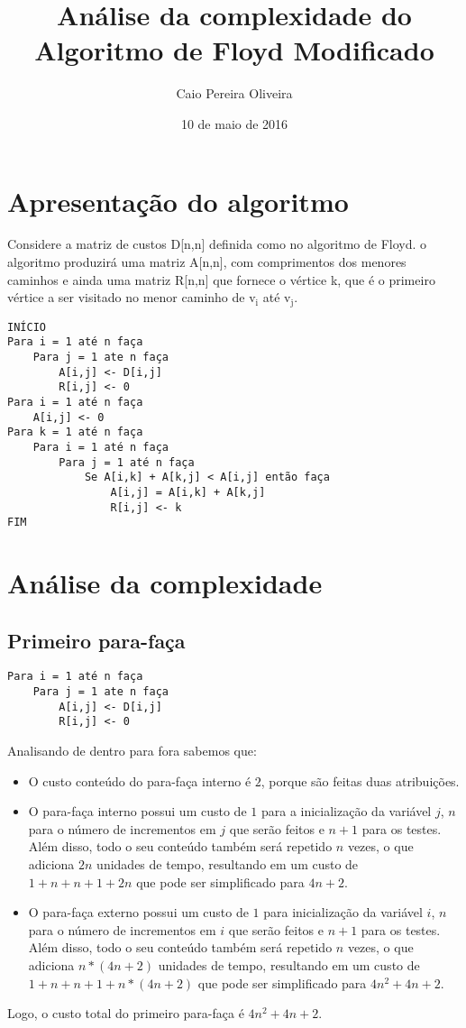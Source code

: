 \documentclass[a4paper,12pt]{article}
\title{Análise da complexidade do Algoritmo de Floyd Modificado}
\author{Caio Pereira Oliveira}
\date{10 de maio de 2016}
\newcommand{\subscript}[1]{$_{\text{#1}}$}
\begin{document}
\maketitle

\section*{Apresentação do algoritmo}

Considere a matriz de custos D[n,n] definida como no
algoritmo de Floyd. o algoritmo produzirá uma matriz A[n,n], com
comprimentos dos menores caminhos e ainda uma matriz R[n,n] que fornece o vértice k, que é o primeiro vértice a ser visitado no menor caminho de v\subscript{i} até v\subscript{j}.

\begin{verbatim}
INÍCIO
Para i = 1 até n faça
    Para j = 1 ate n faça
        A[i,j] <- D[i,j]
        R[i,j] <- 0
Para i = 1 até n faça
    A[i,j] <- 0
Para k = 1 até n faça
    Para i = 1 até n faça
        Para j = 1 até n faça
            Se A[i,k] + A[k,j] < A[i,j] então faça
                A[i,j] = A[i,k] + A[k,j]
                R[i,j] <- k
FIM
\end{verbatim}

\newpage

\section*{Análise da complexidade}
\subsection*{Primeiro para-faça}
\begin{verbatim}
Para i = 1 até n faça
    Para j = 1 ate n faça
        A[i,j] <- D[i,j]
        R[i,j] <- 0
\end{verbatim}

Analisando de dentro para fora sabemos que:

\begin{itemize}
    \item O custo conteúdo do para-faça interno é $2$, porque são feitas duas atribuições.
    
    \item O para-faça interno possui um custo de $1$ para a inicialização da variável $j$, $n$ para o número de incrementos em $j$ que serão feitos e $n+1$ para os testes. Além disso, todo o seu conteúdo também será repetido $n$ vezes, o que adiciona $2n$ unidades de tempo, resultando em um custo de $1 + n + n+1 + 2n$ que pode ser simplificado para $4n+2$.
    
    \item O para-faça externo possui um custo de $1$ para inicialização da variável $i$, $n$ para o número de incrementos em $i$ que serão feitos e $n+1$ para os testes. Além disso, todo o seu conteúdo também será repetido $n$ vezes, o que adiciona $n*(4n+2)$ unidades de tempo, resultando em um custo de $1 + n + n+1 + n*(4n+2)$ que pode ser simplificado para $4n^2+4n+2$.
\end{itemize}
Logo, o custo total do primeiro para-faça é $4n^2+4n+2$.
\end{document}
